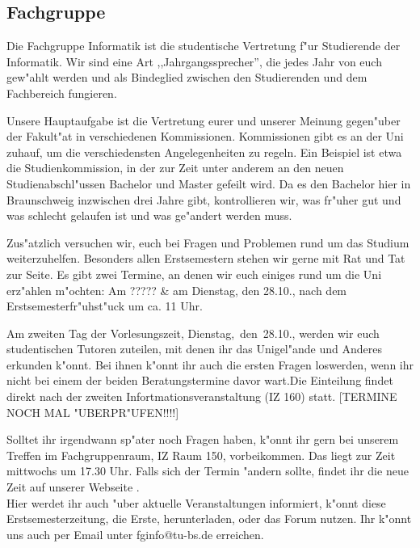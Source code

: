 \subsection{Fachgruppe}

Die Fachgruppe Informatik ist die studentische Vertretung f"ur Studierende der Informatik.
Wir sind eine Art ,,Jahrgangssprecher'', die jedes Jahr von euch gew"ahlt werden und als Bindeglied zwischen den Studierenden und dem Fachbereich fungieren.

Unsere Hauptaufgabe ist die Vertretung eurer und unserer Meinung gegen"uber der
Fakult"at in verschiedenen Kommissionen. Kommissionen gibt es an der Uni zuhauf, um die verschiedensten Angelegenheiten zu regeln. Ein Beispiel ist etwa die Studienkommission, in der zur Zeit unter anderem an den neuen Studienabschl"ussen Bachelor und Master gefeilt wird. Da es den Bachelor hier in Braunschweig inzwischen drei Jahre gibt, kontrollieren wir, was fr"uher gut und was schlecht gelaufen ist und was ge"andert werden muss.

Zus"atzlich versuchen wir, euch bei Fragen und Problemen rund um das Studium weiterzuhelfen. Besonders allen Erstsemestern stehen wir gerne mit Rat und Tat zur Seite. Es gibt zwei Termine, an denen wir euch einiges rund um die Uni erz"ahlen m"ochten: Am ????? \& am Dienstag, den 28.10., nach dem Erstsemesterfr"uhst"uck um ca. 11 Uhr. \par
Am zweiten Tag der Vorlesungszeit, \mbox{Dienstag, den 28.10.}, werden wir euch studentischen Tutoren zuteilen, mit denen ihr das Unigel"ande und Anderes erkunden k"onnt. Bei ihnen k"onnt ihr auch die ersten Fragen loswerden, wenn ihr nicht bei einem der beiden Beratungstermine davor wart.Die Einteilung findet direkt nach der zweiten Infortmationsveranstaltung (IZ 160) statt. [TERMINE NOCH MAL "UBERPR"UFEN!!!!]

Solltet ihr irgendwann sp"ater noch Fragen haben, k"onnt ihr gern bei unserem Treffen im Fachgruppenraum, IZ Raum 150, vorbeikommen. Das liegt zur Zeit mittwochs um 17.30 Uhr. 
Falls sich der Termin "andern sollte, findet ihr die neue Zeit auf unserer Webseite \mbox{}. \\
Hier werdet ihr auch "uber aktuelle Veranstaltungen informiert, k"onnt diese Erstsemesterzeitung, die Erste, herunterladen, oder das Forum nutzen.
Ihr k"onnt uns auch per Email unter fginfo@tu-bs.de erreichen.
